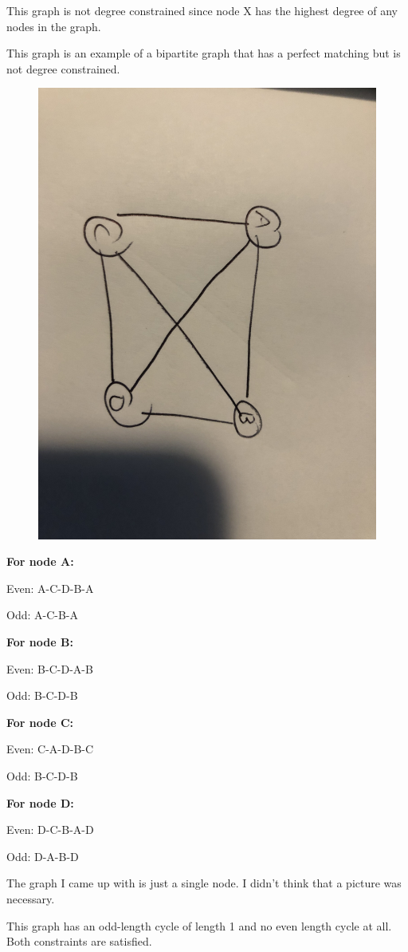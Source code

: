 \documentclass{6042}
\begin{document}
This graph is not degree constrained since node X has the highest degree of any nodes in the graph.

This graph is an example of a bipartite graph that has a perfect matching but is not degree constrained.




\begin{figure}[h!]
    \includegraphics[width=0.6\linewidth]{prob4graph.jpg}

\end{figure}

\textbf{For node A:}

Even: A-C-D-B-A

Odd: A-C-B-A

\textbf{For node B:}

Even: B-C-D-A-B

Odd: B-C-D-B

\textbf{For node C:}

Even: C-A-D-B-C

Odd: B-C-D-B

\textbf{For node D:}

Even: D-C-B-A-D

Odd: D-A-B-D


The graph I came up with is just a single node. I didn't think that a picture was necessary.

This graph has an odd-length cycle of length 1 and no even length cycle at all. Both constraints are satisfied.
\end{document}
